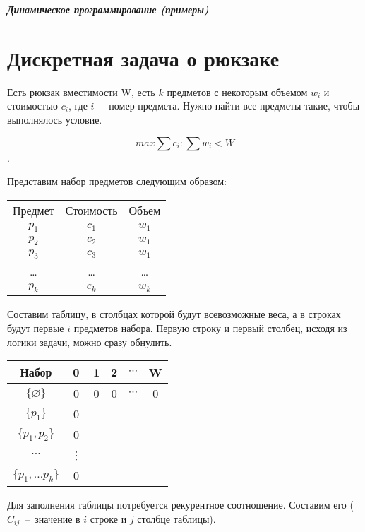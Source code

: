 \documentclass[a4paper,12pt] {report} 			%
\begin{document}
\begin{center}
	{\LARGE \bfseries \slshape Динамическое программирование (примеры)}
\end{center}

\section{Дискретная задача о рюкзаке}

Есть рюкзак вместимости W, есть $k$ предметов с некоторым 
объемом $w_{i}$ и стоимостью $c_{i}$, где $i$~--~номер предмета. 
Нужно найти все предметы такие, чтобы выполнялось условие.

$$max \sum c_{i} : \sum w_{i} < W$$.

Представим набор предметов следующим образом:

\begin{center}
	\begin{tabular}{ c c c }
		Предмет & Стоимость & Объем  \\
		$p_{1}$ & $c_{1}$ & $w_{1}$ \\
		$p_{2}$ & $c_{2}$ & $w_{1}$ \\
		$p_{3}$ & $c_{3}$ & $w_{1}$ \\
		\ldots & \ldots & \ldots \\
		$p_{k}$ & $c_{k}$ & $w_{k}$
	\end{tabular}
\end{center}

Составим таблицу, в столбцах которой будут всевозможные веса, а в строках 
будут первые $i$ предметов набора. Первую строку и первый столбец, исходя 
из логики задачи, можно сразу обнулить.

\begin{center}
	\begin{tabular}{ | c | c c c c c | }
		\hline
		Набор & 0 & 1 & 2 & $\cdots$ & W \\
		\hline
		$\{ \varnothing \}$ & 0 & 0 & 0 & $\cdots$ & 0 \\
		$\{ p_{1} \}$ & 0 &   &  &  &  \\
		$\{ p_{1},p_{2} \}$ & 0 &   &  &  &  \\
		$\cdots$ & \vdots &  &  &  & \\
		$\{ p_{1}, \ldots p_{k} \}$ & 0 &   &  &  &  \\
		\hline
	\end{tabular}
\end{center}

Для заполнения таблицы потребуется рекурентное соотношение. 
Составим его ($C_{ij}$~--~значение в $i$ строке и $j$ столбце таблицы).
\end{document}
